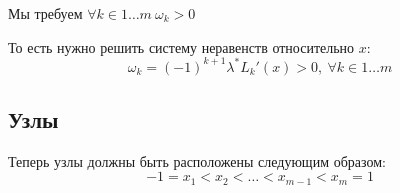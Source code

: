 \documentclass[12pt,a4paper]{article}
\begin{document}
	Мы требуем $\forall k \in 1 \ldots m \ \omega_k > 0 $
	
	\noindent То есть нужно решить систему неравенств относительно $x$:
	\[
	\omega_k  = 
	(-1)^{k+1} \lambda^* L_k'(x)> 0 , \ \forall k \in 1 \ldots m 
	\]
	
	\subsection{Узлы}
	
	Теперь узлы должны быть расположены следующим образом:
	\[
	-1 = x_1 < x_2 < \ldots < x_{m-1} < x_m = 1
	\]
	
\end{document}

